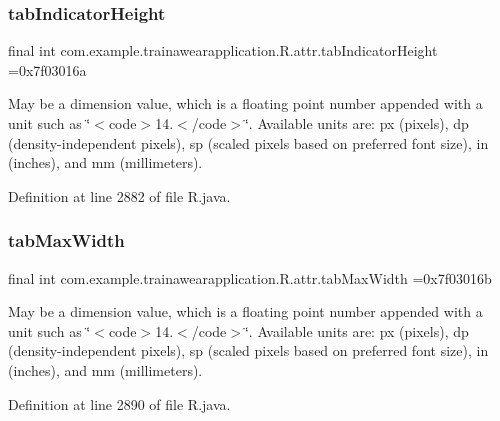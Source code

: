 \subsubsection{\texorpdfstring{tabIndicatorHeight}{tabIndicatorHeight}}
{\footnotesize\ttfamily final int com.\+example.\+trainawearapplication.\+R.\+attr.\+tab\+Indicator\+Height =0x7f03016a\hspace{0.3cm}{\ttfamily [static]}}

May be a dimension value, which is a floating point number appended with a unit such as \char`\"{}$<$code$>$14.\+5sp$<$/code$>$\char`\"{}. Available units are\+: px (pixels), dp (density-\/independent pixels), sp (scaled pixels based on preferred font size), in (inches), and mm (millimeters). 

Definition at line 2882 of file R.\+java.

\mbox{\label{classcom_1_1example_1_1trainawearapplication_1_1_r_1_1attr_adeddc39b55eccd7dcb3e55484b70911a}} 
\subsubsection{\texorpdfstring{tabMaxWidth}{tabMaxWidth}}
{\footnotesize\ttfamily final int com.\+example.\+trainawearapplication.\+R.\+attr.\+tab\+Max\+Width =0x7f03016b\hspace{0.3cm}{\ttfamily [static]}}

May be a dimension value, which is a floating point number appended with a unit such as \char`\"{}$<$code$>$14.\+5sp$<$/code$>$\char`\"{}. Available units are\+: px (pixels), dp (density-\/independent pixels), sp (scaled pixels based on preferred font size), in (inches), and mm (millimeters). 

Definition at line 2890 of file R.\+java.

\mbox{\label{classcom_1_1example_1_1trainawearapplication_1_1_r_1_1attr_a962cab305acbc7f337ea16fd1379e89f}} 
